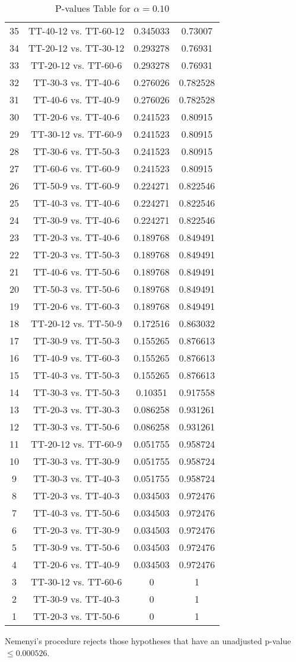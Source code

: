 \documentclass[a4paper,10pt]{article}
\begin{document}
\begin{landscape}
\begin{table}[!htp]
\begin{tabular}{cccc}
35&TT-40-12 vs. TT-60-12&0.345033&0.73007\\
34&TT-20-12 vs. TT-30-12&0.293278&0.76931\\
33&TT-20-12 vs. TT-60-6&0.293278&0.76931\\
32&TT-30-3 vs. TT-40-6&0.276026&0.782528\\
31&TT-40-6 vs. TT-40-9&0.276026&0.782528\\
30&TT-20-6 vs. TT-40-6&0.241523&0.80915\\
29&TT-30-12 vs. TT-60-9&0.241523&0.80915\\
28&TT-30-6 vs. TT-50-3&0.241523&0.80915\\
27&TT-60-6 vs. TT-60-9&0.241523&0.80915\\
26&TT-50-9 vs. TT-60-9&0.224271&0.822546\\
25&TT-40-3 vs. TT-40-6&0.224271&0.822546\\
24&TT-30-9 vs. TT-40-6&0.224271&0.822546\\
23&TT-20-3 vs. TT-40-6&0.189768&0.849491\\
22&TT-20-3 vs. TT-50-3&0.189768&0.849491\\
21&TT-40-6 vs. TT-50-6&0.189768&0.849491\\
20&TT-50-3 vs. TT-50-6&0.189768&0.849491\\
19&TT-20-6 vs. TT-60-3&0.189768&0.849491\\
18&TT-20-12 vs. TT-50-9&0.172516&0.863032\\
17&TT-30-9 vs. TT-50-3&0.155265&0.876613\\
16&TT-40-9 vs. TT-60-3&0.155265&0.876613\\
15&TT-40-3 vs. TT-50-3&0.155265&0.876613\\
14&TT-30-3 vs. TT-50-3&0.10351&0.917558\\
13&TT-20-3 vs. TT-30-3&0.086258&0.931261\\
12&TT-30-3 vs. TT-50-6&0.086258&0.931261\\
11&TT-20-12 vs. TT-60-9&0.051755&0.958724\\
10&TT-30-3 vs. TT-30-9&0.051755&0.958724\\
9&TT-30-3 vs. TT-40-3&0.051755&0.958724\\
8&TT-20-3 vs. TT-40-3&0.034503&0.972476\\
7&TT-40-3 vs. TT-50-6&0.034503&0.972476\\
6&TT-20-3 vs. TT-30-9&0.034503&0.972476\\
5&TT-30-9 vs. TT-50-6&0.034503&0.972476\\
4&TT-20-6 vs. TT-40-9&0.034503&0.972476\\
3&TT-30-12 vs. TT-60-6&0&1\\
2&TT-30-9 vs. TT-40-3&0&1\\
1&TT-20-3 vs. TT-50-6&0&1\\
\hline
\end{tabular}
\caption{P-values Table for $\alpha=0.10$}
\end{table}Nemenyi's procedure rejects those hypotheses that have an unadjusted p-value $\le0.000526$.


\end{landscape}
\end{document}
